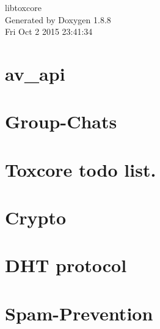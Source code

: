 \documentclass[twoside]{book}
\newcommand{\+}{\discretionary{\mbox{\scriptsize$\hookleftarrow$}}{}{}}
\newcommand{\clearemptydoublepage}{%
  \newpage{\pagestyle{empty}\cleardoublepage}%
}
\begin{document}
\hypersetup{pageanchor=false,
             bookmarks=true,
             bookmarksnumbered=true,
             pdfencoding=unicode
            }
\begin{titlepage}
\vspace*{7cm}
\begin{center}%
{\Large libtoxcore }\\
\vspace*{1cm}
{\large Generated by Doxygen 1.8.8}\\
\vspace*{0.5cm}
{\small Fri Oct 2 2015 23:41:34}\\
\end{center}
\end{titlepage}
\clearemptydoublepage
\tableofcontents
\clearemptydoublepage
{}
\hypersetup{pageanchor=true}

\chapter{av\+\_\+api}
\label{dd/d5c/md_docs_av_api}
\hypertarget{dd/d5c/md_docs_av_api}{}

\chapter{Group-\/\+Chats}
\label{d3/d44/md_docs__group-_chats}
\hypertarget{d3/d44/md_docs__group-_chats}{}

\chapter{Toxcore todo list.}
\label{de/d77/md_docs__t_o_d_o}
\hypertarget{de/d77/md_docs__t_o_d_o}{}

\chapter{Crypto}
\label{d8/d2c/md_docs_updates__crypto}
\hypertarget{d8/d2c/md_docs_updates__crypto}{}

\chapter{D\+H\+T protocol}
\label{d1/dd3/md_docs_updates__d_h_t}
\hypertarget{d1/dd3/md_docs_updates__d_h_t}{}

\chapter{Spam-\/\+Prevention}
\label{d1/d3e/md_docs_updates__spam-_prevention}
\hypertarget{d1/d3e/md_docs_updates__spam-_prevention}{}

\end{document}
